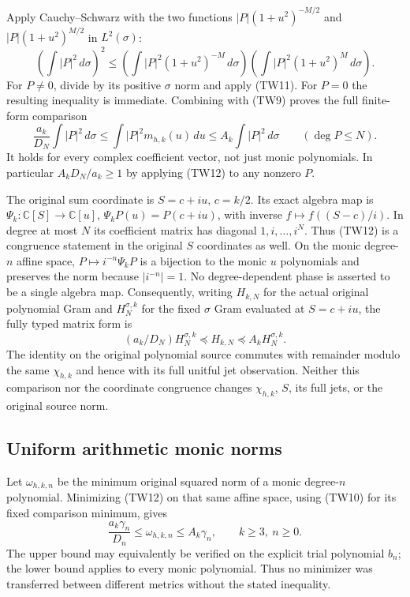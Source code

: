 Apply Cauchy--Schwarz with the two functions
$|P|(1+u^2)^{-M/2}$ and $|P|(1+u^2)^{M/2}$ in $L^2(\sigma)$:
\[
 \left(\int|P|^2\,d\sigma\right)^2
 \leq\left(\int|P|^2(1+u^2)^{-M}\,d\sigma\right)
       \left(\int|P|^2(1+u^2)^M\,d\sigma\right).
\]
For $P\ne0$, divide by its positive $\sigma$ norm and apply (TW11).
For $P=0$ the resulting inequality is immediate.
Combining with (TW9) proves the full finite-form comparison
\[
 \boxed{
 \frac{a_k}{D_N}\int|P|^2\,d\sigma
 \leq\int|P|^2m_{h,k}(u)\,du
 \leq A_k\int|P|^2\,d\sigma
 \qquad(\deg P\leq N).}
 \tag{TW12}
\]
It holds for every complex coefficient vector, not just monic polynomials.
In particular $A_kD_N/a_k\geq1$ by applying (TW12) to any nonzero $P$.

The original sum coordinate is $S=c+iu$, $c=k/2$.  Its exact algebra
map is $\Psi_k:\mathbb{C}[S]\to\mathbb{C}[u]$,
$\Psi_k P(u)=P(c+iu)$, with inverse $f\mapsto f((S-c)/i)$.
In degree at most $N$ its coefficient matrix has diagonal
$1,i,\ldots,i^N$.  Thus (TW12) is a congruence statement in the
original $S$ coordinates as well.  On the monic degree-$n$ affine
space, $P\mapsto i^{-n}\Psi_kP$ is a bijection to the monic $u$
polynomials and preserves the norm because $|i^{-n}|=1$.
No degree-dependent phase is asserted to be a single algebra map.
Consequently, writing $H_{k,N}$ for the actual original polynomial
Gram and $H_{N}^{\sigma,k}$ for the fixed $\sigma$ Gram evaluated at
$S=c+iu$, the fully typed matrix form is
\[
 \boxed{(a_k/D_N)H_N^{\sigma,k}\preceq H_{k,N}
 \preceq A_kH_N^{\sigma,k}.}\tag{TW13}
\]
The identity on the original polynomial source commutes with remainder
modulo the same $\chi_{h,k}$ and hence with its full unitful jet
observation.  Neither this comparison nor the coordinate congruence
changes $\chi_{h,k}$, $S$, its full jets, or the original source norm.

\subsection{Uniform arithmetic monic norms}

Let $\omega_{h,k,n}$ be the minimum original squared norm of a monic
degree-$n$ polynomial.  Minimizing (TW12) on that same affine space,
using (TW10) for its fixed comparison minimum, gives
\[
 \boxed{\frac{a_k\gamma_n}{D_n}\leq\omega_{h,k,n}
 \leq A_k\gamma_n,\qquad k\geq3,\ n\geq0.}\tag{TW14}
\]
The upper bound may equivalently be verified on the explicit trial
polynomial $b_n$; the lower bound applies to every monic polynomial.
Thus no minimizer was transferred between different metrics without
the stated inequality.

